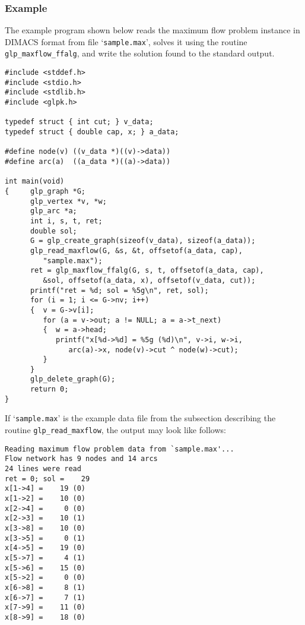 \subsubsection*{Example}

The example program shown below reads the maximum flow problem instance
in DIMACS format from file `\verb|sample.max|', solves it using the
routine \verb|glp_maxflow_ffalg|, and write the solution found to the
standard output.

\begin{footnotesize}
\begin{verbatim}
#include <stddef.h>
#include <stdio.h>
#include <stdlib.h>
#include <glpk.h>

typedef struct { int cut; } v_data;
typedef struct { double cap, x; } a_data;

#define node(v) ((v_data *)((v)->data))
#define arc(a)  ((a_data *)((a)->data))

int main(void)
{     glp_graph *G;
      glp_vertex *v, *w;
      glp_arc *a;
      int i, s, t, ret;
      double sol;
      G = glp_create_graph(sizeof(v_data), sizeof(a_data));
      glp_read_maxflow(G, &s, &t, offsetof(a_data, cap),
         "sample.max");
      ret = glp_maxflow_ffalg(G, s, t, offsetof(a_data, cap),
         &sol, offsetof(a_data, x), offsetof(v_data, cut));
      printf("ret = %d; sol = %5g\n", ret, sol);
      for (i = 1; i <= G->nv; i++)
      {  v = G->v[i];
         for (a = v->out; a != NULL; a = a->t_next)
         {  w = a->head;
            printf("x[%d->%d] = %5g (%d)\n", v->i, w->i,
               arc(a)->x, node(v)->cut ^ node(w)->cut);
         }
      }
      glp_delete_graph(G);
      return 0;
}
\end{verbatim}
\end{footnotesize}

If `\verb|sample.max|' is the example data file from the subsection
describing the routine \verb|glp_read_maxflow|, the output may look like
follows:

\begin{footnotesize}
\begin{verbatim}
Reading maximum flow problem data from `sample.max'...
Flow network has 9 nodes and 14 arcs
24 lines were read
ret = 0; sol =    29
x[1->4] =    19 (0)
x[1->2] =    10 (0)
x[2->4] =     0 (0)
x[2->3] =    10 (1)
x[3->8] =    10 (0)
x[3->5] =     0 (1)
x[4->5] =    19 (0)
x[5->7] =     4 (1)
x[5->6] =    15 (0)
x[5->2] =     0 (0)
x[6->8] =     8 (1)
x[6->7] =     7 (1)
x[7->9] =    11 (0)
x[8->9] =    18 (0)
\end{verbatim}
\end{footnotesize}


